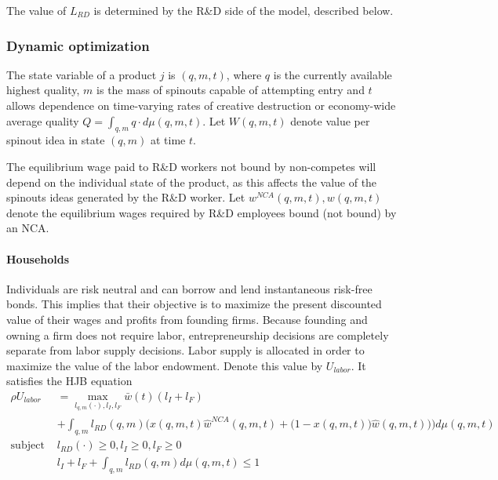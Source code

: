 \documentclass[12pt,english]{article}
\theoremstyle{remark}
\begin{document}
The value of $L_{RD}$ is determined by the R\&D side of the model, described below.

\subsubsection{Dynamic optimization}

The state variable of a product $j$ is $(q,m,t)$, where $q$ is the currently available highest quality, $m$ is the mass of spinouts capable of attempting entry and $t$ allows dependence on time-varying rates of creative destruction or economy-wide average quality $Q = \int_{q,m} q  \cdot d\mu(q,m,t)$. Let $W(q,m,t)$ denote value per spinout idea in state $(q,m)$ at time $t$. 

The equilibrium wage paid to R\&D workers not bound by non-competes will depend on the individual state of the product, as this affects the value of the spinouts ideas generated by the R\&D worker. Let $w^{NCA}(q,m,t),w(q,m,t)$ denote the equilibrium wages required by R\&D employees bound (not bound) by an NCA.

\paragraph{Households}

Individuals are risk neutral and can borrow and lend instantaneous risk-free bonds. This implies that their objective is to maximize the present discounted value of their wages and profits from founding firms. Because founding and owning a firm does not require labor, entrepreneurship decisions are completely separate from labor supply decisions. Labor supply is allocated in order to maximize the value of the labor endowment. Denote this value by $U_{labor}$. It satisfies the HJB equation
\begin{align}
\rho U_{labor} &= \max_{l_{q,m}(\cdot),l_I,l_F} \bar{w}(t) (l_I + l_F) \nonumber\\
&+ \int_{q,m} l_{RD} (q,m) \Bigg(x(q,m,t) \hat{w}^{NCA}(q,m,t) + \Big(1-x(q,m,t) \Big)\hat{w}(q,m,t))  \Bigg) d\mu(q,m,t) \nonumber  \\
\textrm{subject to: }  & l_{RD}(\cdot) \ge 0, l_I \ge 0, l_F \ge 0  \nonumber \\
& l_I + l_F + \int_{q,m} l_{RD}(q,m) d\mu(q,m,t) \le 1 
\end{align}
\end{document}
